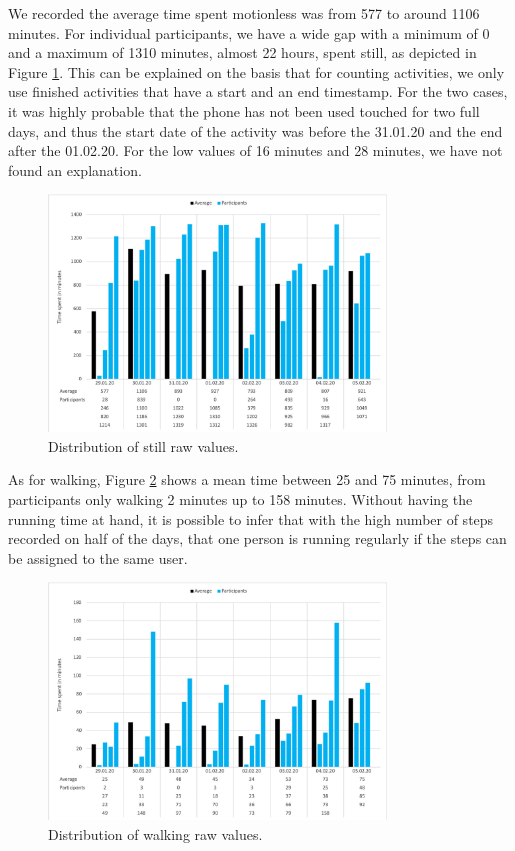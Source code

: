 
We recorded the average time spent motionless was from 577 to around 1106 minutes. For individual participants, we have a wide gap with a minimum of 0 and a maximum of 1310 minutes, almost 22 hours, spent still, as depicted in Figure \ref{fig:diagram_still}. This can be explained on the basis that for counting activities, we only use finished activities that have a start and an end timestamp. For the two cases, it was highly probable that the phone has not been used touched for two full days, and thus the start date of the activity was before the 31.01.20 and the end after the 01.02.20. For the low values of 16 minutes and 28 minutes, we have not found an explanation. 

\begin{figure}[htbp]
  \centering
  \includegraphics[width=0.8\textwidth]{figures/diagram_still}
  \caption{Distribution of still raw values.} \label{fig:diagram_still}
\end{figure}

As for walking, Figure \ref{fig:diagram_walking} shows a mean time between 25 and 75 minutes, from participants only walking 2 minutes up to 158 minutes. Without having the running time at hand, it is possible to infer that with the high number of steps recorded on half of the days, that one person is running regularly if the steps can be assigned to the same user.

\begin{figure}[htbp]
  \centering
  \includegraphics[width=0.8\textwidth]{figures/diagram_walking.png}
  \caption{Distribution of walking raw values.} \label{fig:diagram_walking}
\end{figure}

